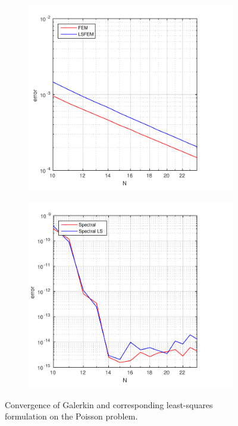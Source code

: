 \begin{figure}[t]
  \centering
  \begin{subfigure}[b]{0.48\textwidth}
	\includegraphics[width=\textwidth]{Figures/errorFEM-LSFEM.pdf}
  \end{subfigure}%
  \quad
  \begin{subfigure}[b]{0.48\textwidth}
	\includegraphics[width=\textwidth]{Figures/errorSpec-SpecLS.pdf}
  \end{subfigure}
  \vspace{-0.1\baselineskip}
  \caption{Convergence of Galerkin and corresponding least-squares formulation on the Poisson problem.}
  \label{fig:ConvergencePoisson}
\end{figure}
